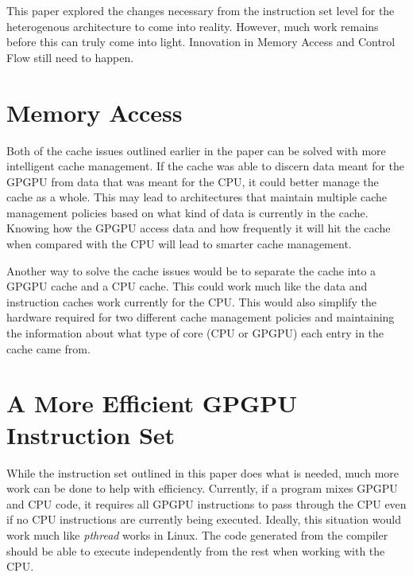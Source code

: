 This paper explored the changes necessary from the instruction set level for the heterogenous architecture to come into reality. However, much work remains before this can truly come into light. Innovation in Memory Access and Control Flow still need to happen. 

\section*{Memory Access}

Both of the cache issues outlined earlier in the paper can be solved with more intelligent cache management. If the cache was able to discern data meant for the GPGPU from data that was meant for the CPU, it could better manage the cache as a whole. This may lead to architectures that maintain multiple cache management policies based on what kind of data is currently in the cache. Knowing how the GPGPU access data and how frequently it will hit the cache when compared with the CPU will lead to smarter cache management. 

Another way to solve the cache issues would be to separate the cache into a GPGPU cache and a CPU cache. This could work much like the data and instruction caches work currently for the CPU. This would also simplify the hardware required for two different cache management policies and maintaining the information about what type of core (CPU or GPGPU) each entry in the cache came from.


\section*{A More Efficient GPGPU Instruction Set}

While the instruction set outlined in this paper does what is needed, much more work can be done to help with efficiency. Currently, if a program mixes GPGPU and CPU code, it requires all GPGPU instructions to pass through the CPU even if no CPU instructions are currently being executed. Ideally, this situation would work much like \textit{pthread} works in Linux. The code generated from the compiler should be able to execute independently from the rest when working with the CPU. 
